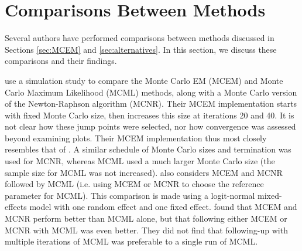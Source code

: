\documentclass[11pt, oneside]{article}   	%
\newcommand{\bQ}{\mathbb{Q}}
\begin{document}
\begin{comment}
A major advantage of the mean-field approximation is that an iterative algorithm exists for finding the density, $q$, which maximizes the ELBO. This algorithm performs coordinate ascent, and the coordinate updates are closely related to computation of the full conditional distributions in Gibbs sampling \citep{need}. Write $q^{(k)} = \prod q_j^{(k)}$ for the current value of $q$, and $\bQ^{(k)}_{-j}$ for expectation with respect to all the missing variables except $j$, under $q^{(k)}$. The update formula is
%
\begin{align}
    q_j^{(k+1)} &\propto \exp \left[ \bQ^{(k)}_{-j} \ell_c(y, x_j, X_{-j}) \right] \label{eq:var_inf_update}
\end{align}
%
where $X_{-j}$ is all the missing variables other than $X_j$. See Section 2.4 of \citet{Ble17} for a derivation of (\ref{eq:var_inf_update}). The overall algorithm consists of repeatedly cycling through updating each coordinate's distribution until some convergence criterion is met.

Note that, so far, our discussion of how to compute the mean-field approximate density for $X$ has not addressed $\theta$. To apply mean-field variational inference to EM-type problems, we substitute the mean-field density into the ELBO and maximize over $\theta$. This new value of $\theta$ is fed back into ($\ref{eq:var_inf_update}$), giving us a different complete data likelihood function and, hence, a new optimal density.
\end{comment}

\section{Comparisons Between Methods}
\label{sec:comparison}

Several authors have performed comparisons between methods discussed in Sections \ref{sec:MCEM} and \ref{sec:alternatives}. In this section, we discuss these comparisons and their findings.

\citet{McC97} use a simulation study to compare the Monte Carlo EM (MCEM) and Monte Carlo Maximum Likelihood (MCML) methods, along with a Monte Carlo version of the Newton-Raphson algorithm (MCNR). Their MCEM implementation starts with fixed Monte Carlo size, then increases this size at iterations 20 and 40. It is not clear how these jump points were selected, nor how convergence was assessed beyond examining plots. Their MCEM implementation thus most closely resembles that of \citet{Wei90}. A similar schedule of Monte Carlo sizes and termination was used for MCNR, whereas MCML used a much larger Monte Carlo size (the sample size for MCML was not increased). \citeauthor{McC97} also considers MCEM and MCNR followed by MCML (i.e. using MCEM or MCNR to choose the reference parameter for MCML). This comparison is made using a logit-normal mixed-effects model with one random effect and one fixed effect. \citeauthor{McC97} found that MCEM and MCNR perform better than MCML alone, but that following either MCEM or MCNR with MCML was even better. They did not find that following-up with multiple iterations of MCML was preferable to a single run of MCML.
\end{document}
